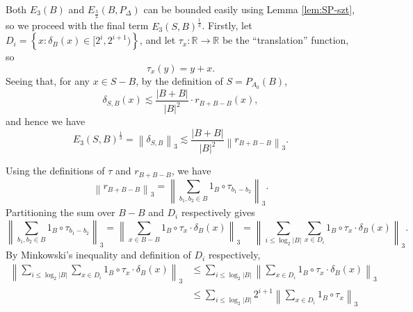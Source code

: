 \documentclass[reqno]{amsart}
\numberwithin{equation}{section}
\begin{document}
Both \(E_3(B)\) and \(E_{\frac{3}{2} } (B,P_{\Delta} )\) can be bounded easily using Lemma \ref{lem:SP-szt},
so we proceed with the final term
\(E_{3} (S,B)^{\frac{1}{3} }\). Firstly, let \(D_{i} = \left\{ x : \delta_{B}  (x) \in [2^{i},2^{i+1}) \right\} \),
and let \(\tau_{x} :\mathbb{R}  \to \mathbb{R} \) be the ``translation'' function, so
\[
    \tau_{x} (y) = y + x
.\]
Seeing that, for any \(x \in S-B\), by the definition of \(S = P_{A_0} (B)\),
\[
    \delta_{S,B} (x) \lesssim  \frac{\left\lvert B+B \right\rvert }{\left\lvert B \right\rvert ^{2}} \cdot r_{B + B - B} (x) 
,\]
and hence we have
\[
   E_{3} (S,B)^{\frac{1}{3} } = \left\lVert \delta_{S,B}  \right\rVert _{3}  \lesssim  \frac{\left\lvert B + B\right\rvert }{\left\lvert B \right\rvert ^{2}} \left\lVert r_{B + B-B} \right\rVert _{3}
.\]

Using the definitions of \(\tau\) and \(r_{B + B - B} \), we have
\[
    \left\lVert r_{B + B - B}  \right\rVert _{3}  = \left\lVert \sum _{b_1,b_2 \in B}  1_{B} \circ \tau_{b_1 -b_2}   \right\rVert _{3} 
.\]
Partitioning the sum over \(B-B\) and \(D_{i} \) respectively gives
\[
    \left\lVert \sum _{b_1,b_2 \in B}  1_{B} \circ \tau_{b_1 -b_2}   \right\rVert _{3} = \left\lVert \sum _{x \in B-B} 1_{B} \circ \tau_{x} \cdot \delta_{B} (x) \right\rVert   _{3} = \left\lVert \sum _{i \leq \log _{2} \left\lvert B \right\rvert } \sum _{x \in D_{i} } 1_{B} \circ \tau_{x} \cdot \delta_{B} (x) \right\rVert _{3} 
.\]
By Minkowski's inequality and definition of \(D_{i} \) respectively,
\begin{align*}
    \left\lVert \sum _{i \leq \log _{2} \left\lvert B \right\rvert } \sum _{x \in D_{i} } 1_{B} \circ \tau_{x} \cdot \delta_{B} (x) \right\rVert _{3} & \leq \sum _{i \leq \log _{2} \left\lvert B \right\rvert } \left\lVert \sum _{x \in D_{i} } 1_{B} \circ \tau_{x} \cdot \delta_{B} (x) \right\rVert _{3} \\
    & \leq \sum _{i \leq \log _{2} \left\lvert B \right\rvert } 2^{i+1} \left\lVert \sum _{x \in D_{i} } 1_{B} \circ \tau_{x}  \right\rVert _{3} 
\end{align*}
\end{document}

